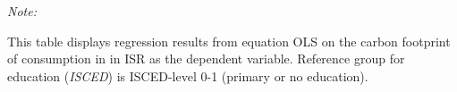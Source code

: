 \begin{table}[htbp!]
\begin{adjustbox}{width = 1\textwidth, max height = 0.95\textheight, center}
\begin{threeparttable}[b]
         \begin{tablenotes}\item \medskip \textit{Note:}
            \item This table displays regression results from equation OLS on the carbon footprint of consumption in  in ISR as the dependent variable.  Reference group for education (\textit{ISCED}) is ISCED-level 0-1 (primary or no education).
         \end{tablenotes}
      \end{threeparttable}
   \end{adjustbox}
\end{table}


